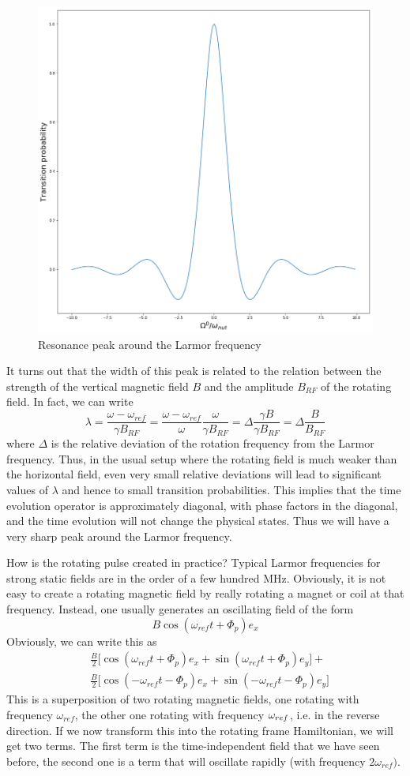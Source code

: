 \documentclass[a4paper, draft]{article}
\theoremstyle{own}
\theoremstyle{remark}
\begin{document}
\begin{figure}[ht]
\centering
\includegraphics[width=0.7\linewidth]{images/NMRResonance}
\caption[Resonance peak]{Resonance peak around the Larmor frequency}
\label{fig:NMRResonance}
\end{figure}

It turns out that the width of this peak is related to the relation between the strength of the vertical magnetic field $B$ and the amplitude $B_{RF}$ of the rotating field. In fact, we can write
$$
\lambda = \frac{\omega - \omega_{ref}}{\gamma B_{RF}} = \frac{\omega - \omega_{ref}}{\omega} \frac{\omega}{\gamma B_{RF}} = \Delta \frac{\gamma B}{\gamma B_{RF}}
= \Delta \frac{B}{B_{RF}}
$$
where $\Delta$ is the relative deviation of the rotation frequency from the Larmor frequency. Thus, in the usual setup where the rotating field is much weaker than the horizontal field, even very small relative deviations will lead to significant values of $\lambda$ and hence to small transition probabilities. This implies that the time evolution operator is approximately diagonal, with phase factors in the diagonal, and the time evolution will not change the physical states. Thus we will have a very sharp peak around the Larmor frequency. 

How is the rotating pulse created in practice? Typical Larmor frequencies for strong static fields are in the order of a few hundred MHz. Obviously, it is not easy to create a rotating magnetic field by really rotating a magnet or coil at that frequency. Instead, one usually generates an oscillating field of the form
$$
B \cos (\omega_{ref} t + \Phi_p) e_x
$$
Obviously, we can write this as
\begin{align*}
& \frac{B}{2} \big[ \cos (\omega_{ref} t + \Phi_p) e_x + \sin (\omega_{ref} t + \Phi_p) e_y \big] + \\
& \frac{B}{2} \big[ \cos (-\omega_{ref} t - \Phi_p) e_x + \sin (-\omega_{ref} t - \Phi_p) e_y \big]
\end{align*}
This is a superposition of two rotating magnetic fields, one rotating with frequency $\omega_{ref}$, the other one rotating with frequency $\-\omega_{ref}$, i.e. in the reverse direction. If we now transform this into the rotating frame Hamiltonian, we will get two terms. The first term is the time-independent field that we have seen before, the second one is a term that will oscillate rapidly (with frequency $2\omega_{ref})$. 
\end{document}
